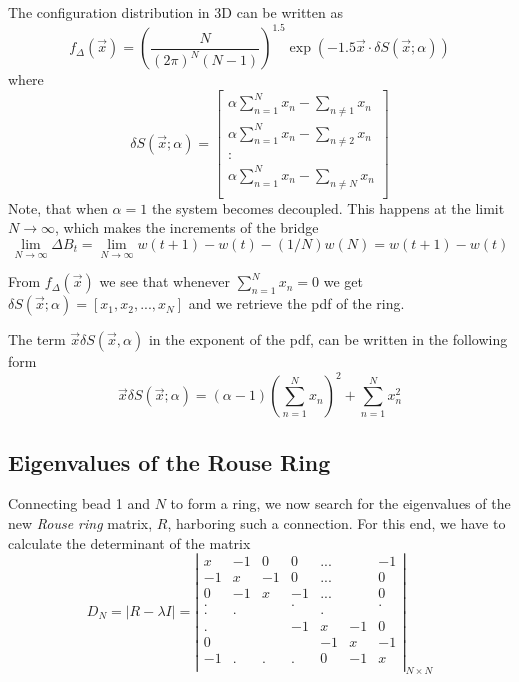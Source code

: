 \documentclass{report}
\begin{document}
The configuration distribution in 3D can be written as 
\begin{equation*}
f_\Delta(\vec{x})=\left(\frac{N}{(2\pi)^N (N-1)} \right)^{1.5}\exp(-1.5\vec{x}\cdot\delta S(\vec{x} ;\alpha))
\end{equation*}
where
\begin{equation*}
\delta S(\vec{x};\alpha)=\left[
\begin{matrix}
\alpha\sum_{n=1}^N x_n -\sum_{n\neq 1}x_n\\
\alpha\sum_{n=1}^N x_n -\sum_{n\neq 2}x_n\\
\colon\\
\alpha\sum_{n=1}^N x_n -\sum_{n\neq N}x_n\\
\end{matrix}
\right]
\end{equation*}
Note, that when $\alpha=1$ the system becomes decoupled. This happens at the limit $N\rightarrow \infty$, which makes the increments of the bridge 
\begin{equation*}
\lim_{N\rightarrow \infty} \Delta B_t=\lim_{N\rightarrow \infty} w(t+1)-w(t)-(1/N)w(N)= w(t+1)-w(t)
\end{equation*}

From $f_\Delta(\vec{x})$ we see that whenever $\displaystyle \sum_{n=1}^{N}x_n = 0$ we get $\delta S(\vec{x};\alpha)=[x_1,x_2,...,x_N]$ and we retrieve the pdf of the ring. 

The term $\vec{x}\delta S(\vec{x},\alpha)$ in the exponent of the pdf, can be written in the following form 
\begin{equation*}
\vec{x}\delta S(\vec{x};\alpha)=(\alpha-1)\left( \sum_{n=1}^N x_n\right)^2 +\sum_{n=1}^N x_n^2
\end{equation*}

\subsection{Eigenvalues of the Rouse Ring}\label{subsection_eigenvaluesOfTheRouseRing}
Connecting bead 1 and $N$ to form a ring, we now search for the eigenvalues of the new \textit{Rouse ring} matrix, $R$, harboring such a connection. For this end, we have to calculate the determinant of the matrix
\begin{equation*}
D_N=|R-\lambda I|=\left|
\begin{matrix}
 x  & -1 &  0 &  0 &...&   & -1 \\
-1  &  x & -1 &  0 &...&   &  0 \\
 0  & -1 &  x & -1 &...&   &  0 \\
 .  &    &    &  . &   &   &  . \\
  . &   .&    &    &  .&   & \\
 .  &    &    & -1 & x &-1 & 0 \\
 0  &    &    &    & -1& x & -1 \\
 -1 &   .&  . & .  &  0&-1 &  x \\     
\end{matrix}
\right|_{N\times N}
\end{equation*}
\end{document}
